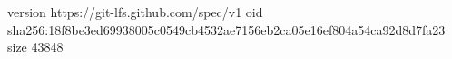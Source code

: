 version https://git-lfs.github.com/spec/v1
oid sha256:18f8be3ed69938005c0549cb4532ae7156eb2ca05e16ef804a54ca92d8d7fa23
size 43848
